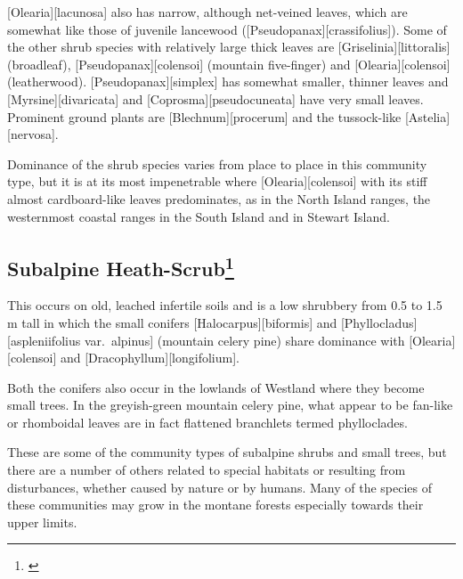 [Olearia][lacunosa] also has narrow, although net-veined leaves, which are somewhat like those of juvenile lancewood ([Pseudopanax][crassifolius]).
Some of the other shrub species with relatively large thick leaves are [Griselinia][littoralis] (broadleaf), [Pseudopanax][colensoi] (mountain five-finger) and [Olearia][colensoi] (leatherwood). [Pseudopanax][simplex] has somewhat smaller, thinner leaves and [Myrsine][divaricata] and [Coprosma][pseudocuneata] have very small leaves.
Prominent ground plants are [Blechnum][procerum] and the tussock-like [Astelia][nervosa].

Dominance of the shrub species varies from place to place in this community type, but it is at its most impenetrable where [Olearia][colensoi] with its stiff almost cardboard-like leaves predominates, as in the North Island ranges, the westernmost coastal ranges in the South Island and in Stewart Island.

\subsection[Subalpine Heath-Scrub]{Subalpine Heath-Scrub\footnote{\cite{burrows1979heathlands}}}

This occurs on old, leached infertile soils and is a low shrubbery from 0.5 to 1.5 m tall in which the small conifers [Halocarpus][biformis] and [Phyllocladus][aspleniifolius var.\ alpinus] (mountain celery pine) share dominance with [Olearia][colensoi] and [Dracophyllum][longifolium].

Both the conifers also occur in the lowlands of Westland where they become small trees.
In the greyish-green mountain celery pine, what appear to be fan-like or rhomboidal leaves are in fact flattened branchlets termed phylloclades.

These are some of the community types of subalpine shrubs and small trees, but there are a number of others related to special habitats or resulting from disturbances, whether caused by nature or by humans.
Many of the species of these communities may grow in the montane forests especially towards their upper limits.

